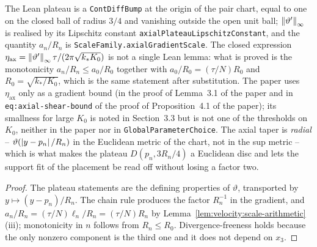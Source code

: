 The Lean plateau is a \texttt{ContDiffBump} at the origin of the pair chart, equal to one
on the closed ball of radius $3/4 $ and vanishing outside the open unit ball;
$\left\|\vartheta'\right\|_\infty $ is realised by its Lipschitz constant
\texttt{axialPlateauLipschitzConstant}, and the quantity $a_n/R_n $ is
\texttt{ScaleFamily.axialGradientScale}.  The closed expression
$\eta_\mathrm{ax}=\left\|\vartheta'\right\|_\infty\tau/(2\pi\sqrt{k_*K_0}) $ is not a single Lean
lemma: what is proved is the monotonicity $a_n/R_n\leq a_0/R_0 $ together with
$a_0/R_0=(\tau/N)R_0 $ and $R_0=\sqrt{k_*/K_0} $, which is the same statement after
substitution.  The paper uses $\eta_\mathrm{ax} $ only as a gradient bound (in the proof of
Lemma~3.1 of the paper and in \texttt{eq:axial-shear-bound} of the proof of
Proposition~4.1 of the paper); its smallness for large $K_0 $ is noted in Section~3.3 but is not one
of the thresholds on $K_0 $, neither in the paper nor in
\texttt{GlobalParameterChoice}.  The axial taper is \emph{radial} --
$\vartheta(\left\lvert y-p_n\right\rvert/R_n)$ in the Euclidean metric of the chart, not in the sup metric --
which is what makes the plateau $D(p_n,3R_n/4)$ a Euclidean disc and lets the support fit of
the placement be read off without losing a factor two.

\begin{proof}
  \leanok
  The plateau statements are the defining properties of $\vartheta $, transported by
  $y\mapsto(y-p_n)/R_n $.  The chain rule produces the factor $R_n^{-1} $ in the gradient,
  and $a_n/R_n=(\tau/N)\ell_n/R_n=(\tau/N)R_n $ by
  Lemma~\ref{lem:velocity:scale-arithmetic}(iii); monotonicity in $n $ follows from
  $R_n\leq R_0 $.  Divergence-freeness holds because the only nonzero component is the third
  one and it does not depend on $x_3 $.
\end{proof}

